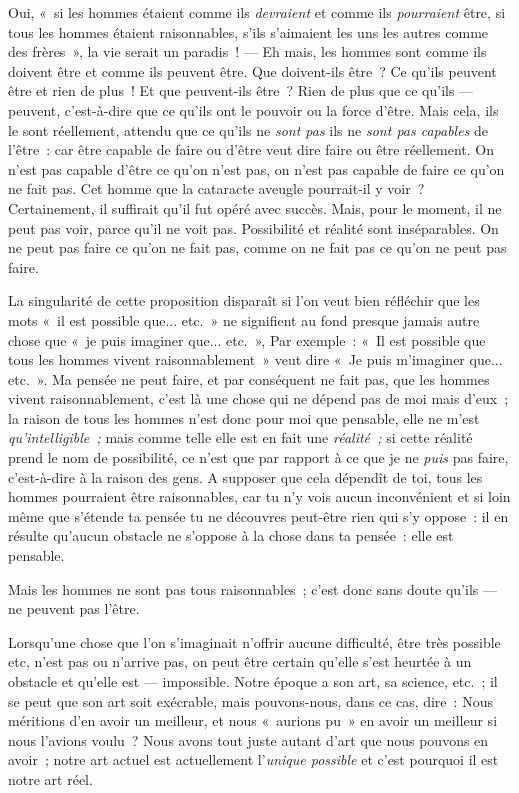 \documentclass[french,twoside]{book} %
\begin{document}
Oui, « si les hommes étaient comme ils \emph{devraient }et comme ils \emph{pourraient} être, si tous les hommes étaient raisonnables, s’ils s’aimaient les uns les autres comme des frères », la vie serait un paradis ! — Eh mais, les hommes sont comme ils doivent être et comme ils peuvent être. Que doivent-ils être ? Ce qu’ils peuvent être et rien de plus ! Et que peuvent-ils être ? Rien de plus que ce qu’ils — peuvent, c’est-à-dire que ce qu’ils ont le pouvoir ou la force d’être. Mais cela, ils le sont réellement, attendu que ce qu’ils ne \emph{sont pas} ils ne \emph{sont pas capables} de l’être : car être capable de faire ou d’être veut dire faire ou être réellement. On n’est pas capable d’être ce qu’on n’est pas, on n’est pas capable de faire ce qu’on ne fait pas. Cet homme que la cataracte aveugle pourrait-il y voir ? Certainement, il suffirait qu’il fut opéré avec succès. Mais, pour le moment, il ne peut pas voir, parce qu’il ne voit pas. Possibilité et réalité sont inséparables. On ne peut pas faire ce qu’on ne fait pas, comme on ne fait pas ce qu’on ne peut pas faire.\par
 La singularité de cette proposition disparaît si l’on veut bien réfléchir que les mots « il est possible que... etc. » ne signifient au fond presque jamais autre chose que « je puis imaginer que... etc. », Par exemple : « Il est possible que tous les hommes vivent raisonnablement » veut dire « Je puis m’imaginer que... etc. ». Ma pensée ne peut faire, et par conséquent ne fait pas, que les hommes vivent raisonnablement, c’est là une chose qui ne dépend pas de moi mais d’eux ; la raison de tous les hommes n’est donc pour moi que pensable, elle ne m’est \emph{qu’intelligible ;} mais comme telle elle est en fait une \emph{réalité ;} si cette réalité prend le nom de possibilité, ce n’est que par rapport à ce que je ne \emph{puis} pas faire, c’est-à-dire à la raison des gens. A supposer que cela dépendît de toi, tous les hommes pourraient être raisonnables, car tu n’y vois aucun inconvénient et si loin même que s’étende ta pensée tu ne découvres peut-être rien qui s’y oppose : il en résulte qu’aucun obstacle ne s’oppose à la chose dans ta pensée : elle est pensable.\par
Mais les hommes ne sont pas tous raisonnables ; c’est donc sans doute qu’ils — ne peuvent pas l’être.\par
Lorsqu’une chose que l’on s’imaginait n’offrir aucune difficulté, être très possible etc, n’est pas ou n’arrive pas, on peut être certain qu’elle s’est heurtée à un obstacle et qu’elle est — impossible. Notre époque a son art, sa science, etc. ; il se peut que son art soit exécrable, mais pouvons-nous, dans ce cas, dire : Nous méritions d’en avoir un meilleur, et nous « aurions pu » en avoir un meilleur si nous l’avions voulu ? Nous avons tout juste autant d’art que nous pouvons en avoir ; notre art actuel est actuellement l’\emph{unique possible} et c’est pourquoi il est notre art réel.\par
\end{document}
